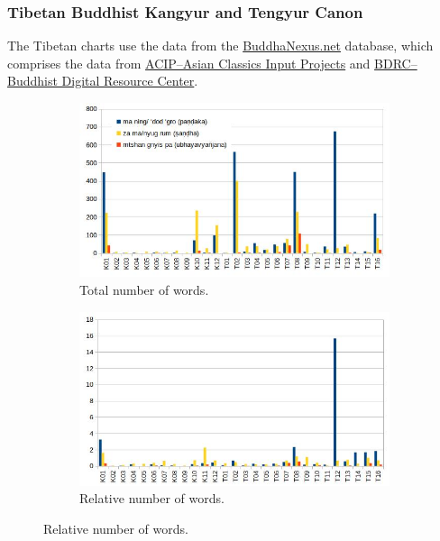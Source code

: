 \newpage
\subsubsection*{Tibetan Buddhist Kangyur and Tengyur Canon}

The Tibetan charts use the data from the \href{https://buddhanexus.net}{BuddhaNexus.net} database, which comprises the data from \href{https://asianclassics.org/}{ACIP--Asian Classics Input Projects} and \href{https://www.tbrc.org/}{BDRC--Buddhist Digital Resource Center}.

\begin{figure}[!h]
  \begin{subfigure}{0.5\linewidth}
    \includegraphics[width=\linewidth]{tibetan.jpg}
    \caption{Total number of words.}
  \end{subfigure}
  \hfill
  \begin{subfigure}{0.5\linewidth}
    \includegraphics[width=\linewidth]{tibetan_weighted.jpg}
    \caption{Relative number of words.}
  \end{subfigure}
\setcounter{figure}{8}
\label{tibetan1}
\end{figure}

